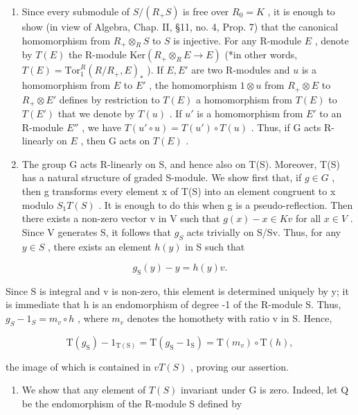 \begin{enumerate}
\def\labelenumi{\alph{enumi})}
\item
  Since every submodule of \(S/(R_{+}S)\) is free over \(R_0 = K\) , it is enough to show (in view of Algebra, Chap. II, §11, no. 4, Prop. 7) that the canonical homomorphism from \(R_{+} \otimes_{R} S\) to \(S\) is injective. For any R-module \(E\) , denote by \(T(E)\) the R-module \(\text{Ker}(R_{+} \otimes_{R} E \to E)\) (*in other words, \(T(E) = \text{Tor}_{1}^{R}(R/R_{+}, E)_*\) ). If \(E, E'\) are two R-modules and \(u\) is a homomorphism from \(E\) to \(E'\) , the homomorphism \(1 \otimes u\) from \(R_{+} \otimes E\) to \(R_{+} \otimes E'\) defines by restriction to \(T(E)\) a homomorphism from \(T(E)\) to \(T(E')\) that we denote by \(T(u)\) . If \(u'\) is a homomorphism from \(E'\) to an R-module \(E''\) , we have \(T(u' \circ u) = T(u') \circ T(u)\) . Thus, if G acts R-linearly on \(E\) , then G acts on \(T(E)\) .
\item
  The group G acts R-linearly on S, and hence also on T(S). Moreover, T(S) has a natural structure of graded S-module. We show first that, if \(g \in G\) , then g transforms every element x of T(S) into an element congruent to x modulo \(S_{1}T(S)\) . It is enough to do this when g is a pseudo-reflection. Then there exists a non-zero vector v in V such that \(g(x) - x \in Kv\) for all \(x \in V\) . Since V generates S, it follows that \(g_{S}\) acts trivially on S/Sv. Thus, for any \(y \in S\) , there exists an element \(h(y)\) in S such that
\end{enumerate}

\[
g _ {\mathrm{S}} (y) - y = h (y) v.
\]

Since S is integral and v is non-zero, this element is determined uniquely by y; it is immediate that h is an endomorphism of degree -1 of the R-module S. Thus, \(g_{S} - 1_{S} = m_{v} \circ h\) , where \(m_{v}\) denotes the homothety with ratio v in S. Hence,

\[
\mathrm{T} (g _ {\mathrm{S}}) - 1 _ {\mathrm{T(S)}} = \mathrm{T} (g _ {\mathrm{S}} - 1 _ {\mathrm{S}}) = \mathrm{T} (m _ {v}) \circ \mathrm{T} (h),
\]

the image of which is contained in \(vT(S)\) , proving our assertion.

\begin{enumerate}
\def\labelenumi{\alph{enumi})}
\setcounter{enumi}{2}
\tightlist
\item
  We show that any element of \(T(S)\) invariant under G is zero. Indeed, let Q be the endomorphism of the R-module S defined by
\end{enumerate}

